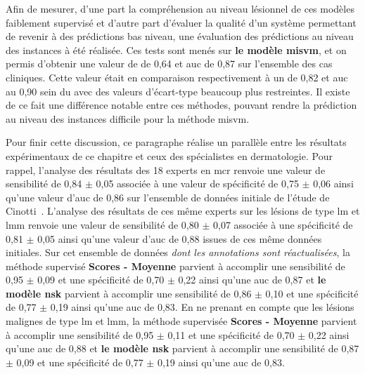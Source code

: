 Afin de mesurer, d'une part la compréhension au niveau lésionnel de ces modèles faiblement supervisé et d'autre part d'évaluer la qualité d'un système permettant de revenir à des prédictions bas niveau, une évaluation des prédictions au niveau des instances à été réalisée. Ces tests sont menés sur \textbf{le modèle \gls{misvm}}, et on permis d'obtenir une valeur de \fscore{} de 0,64 et \gls{auc} de 0,87 sur l'ensemble des cas cliniques. Cette valeur était en comparaison respectivement à un \fscore{} de 0,82 et \gls{auc} au 0,90 sein du  avec des valeurs d'écart-type beaucoup plus restreintes. Il existe de ce fait une différence notable entre ces méthodes, pouvant rendre la prédiction au niveau des instances difficile pour la méthode \gls{misvm}.\par

Pour finir cette discussion, ce paragraphe réalise un parallèle entre les résultats expérimentaux de ce chapitre et ceux des spécialistes en dermatologie. Pour rappel, l'analyse des résultats des 18 experts en \gls{mcr} renvoie une valeur de sensibilité de 0,84 $\pm$ 0,05 associée à une valeur de spécificité de 0,75 $\pm$ 0,06 ainsi qu'une valeur d'\gls{auc} de 0,86 sur l'ensemble de données initiale de l'étude de Cinotti~. L'analyse des résultats de ces même experts sur les lésions de type \gls{lm} et \gls{lmm} renvoie une valeur de sensibilité de 0,80 $\pm$ 0,07 associée à une spécificité de 0,81 $\pm$ 0,05 ainsi qu'une valeur d'\gls{auc} de 0,88  issues de ces même données initiales. Sur cet ensemble de données \textit{dont les annotations sont réactualisées}, la méthode supervisé \textbf{Scores - Moyenne} parvient à accomplir une sensibilité de 0,95 $\pm$ 0,09 et une spécificité de 0,70 $\pm$ 0,22 ainsi qu'une \gls{auc} de 0,87 et \textbf{le modèle \gls{nsk}} parvient à accomplir une sensibilité de 0,86 $\pm$ 0,10 et une spécificité de 0,77 $\pm$ 0,19 ainsi qu'une \gls{auc} de 0,83. En ne prenant en compte que les lésions malignes de type \gls{lm} et \gls{lmm}, la méthode supervisée \textbf{Scores - Moyenne} parvient à accomplir une sensibilité de 0,95 $\pm$ 0,11 et une spécificité de 0,70 $\pm$ 0,22 ainsi qu'une \gls{auc} de 0,88 et \textbf{le modèle \gls{nsk}} parvient à accomplir une sensibilité de 0,87 $\pm$ 0,09 et une spécificité de 0,77 $\pm$ 0,19 ainsi qu'une \gls{auc} de 0,83.\par